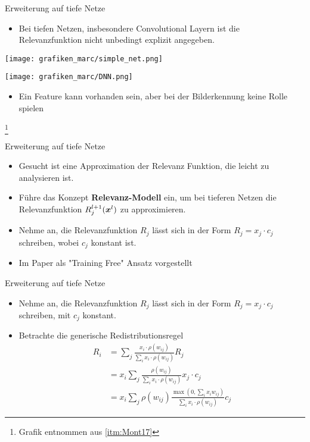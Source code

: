 \begin{frame}{Erweiterung auf tiefe Netze}
\begin{itemize}
\item Bei tiefen Netzen, insbesondere Convolutional Layern ist die Relevanzfunktion nicht unbedingt explizit angegeben.
\end{itemize}
\vspace*{20pt}
\begin{minipage}{0.42\textwidth}
\texttt{[image: grafiken\_marc/simple\_net.png]}
\end{minipage}
\begin{minipage}{0.52\textwidth}
\texttt{[image: grafiken\_marc/DNN.png]}
\end{minipage}
\vspace*{10pt}
\begin{itemize}
\item Ein Feature kann vorhanden sein, aber bei der Bilderkennung keine Rolle spielen
\end{itemize}
\footnote{Grafik entnommen aus \ref{itm:Mont17}}
\end{frame}

\begin{frame}{Erweiterung auf tiefe Netze}
\begin{itemize}
\item Gesucht ist eine Approximation der Relevanz Funktion, die leicht zu analysieren ist.
\item Führe das Konzept \textbf{Relevanz-Modell} ein, um bei tieferen Netzen die Relevanzfunktion $R_j^{l+1}(\boldsymbol{x}^{l})$ zu approximieren.
\item Nehme an, die Relevanzfunktion $R_j$ lässt sich in der Form $R_j = x_j \cdot c_j$ schreiben, wobei $c_j$ konstant ist.
\item Im Paper als "{}Training Free"{} Ansatz vorgestellt
\end{itemize}
\end{frame}

\begin{frame}{Erweiterung auf tiefe Netze}
\begin{itemize}
\item Nehme an, die Relevanzfunktion $R_j$ lässt sich in der Form $R_j = x_j \cdot c_j$ schreiben, mit $c_j$ konstant.
\item Betrachte die generische Redistributionsregel
\begin{align*}
R_i &= \sum_{j} \frac{x_{i} \cdot \rho(w_{i j})}{\sum_{i} x_{i} \cdot \rho(w_{i j})} R_{j}\\
& = x_{i} \sum_{j}  \frac{ \rho(w_{i j})}{\sum_{i} x_{i} \cdot \rho(w_{i j})} x_j \cdot c_j \\
&= x_i \sum_{j}   \rho(w_{i j}) \frac{\max \left(0, \sum_{i} x_{i} w_{i j}\right)}{\sum_{i} x_{i} \cdot \rho(w_{i j})} c_j
\end{align*}
\end{itemize}
\end{frame}

